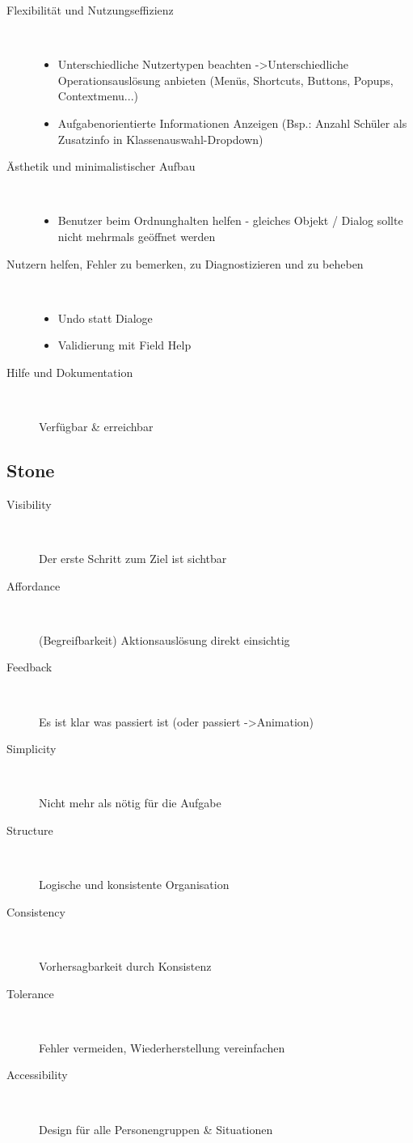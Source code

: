 \documentclass{report}
\begin{document}
\begin{description}
\item[Flexibilität und Nutzungseffizienz]~\par
\begin{itemize}
\item Unterschiedliche Nutzertypen beachten -\textgreater Unterschiedliche Operationsauslösung anbieten (Menüs, Shortcuts, Buttons, Popups, Contextmenu...)
\item Aufgabenorientierte Informationen Anzeigen (Bsp.: Anzahl Schüler als Zusatzinfo in Klassenauswahl-Dropdown)
\end{itemize}

\item[Ästhetik und minimalistischer Aufbau]~\par
\begin{itemize}
\item Benutzer beim Ordnunghalten helfen - gleiches Objekt / Dialog sollte nicht mehrmals geöffnet werden
\end{itemize}

\item[Nutzern helfen, Fehler zu bemerken, zu Diagnostizieren und zu beheben]~\par
\begin{itemize}
\item Undo statt Dialoge
\item Validierung mit Field Help
\end{itemize}
\item[Hilfe und Dokumentation]~\par
Verfügbar \& erreichbar
\end{description}

\newpage

\subsection*{Stone}

\begin{description}
\item[Visibility]~\par Der erste Schritt zum Ziel ist sichtbar
\item[Affordance]~\par (Begreifbarkeit) Aktionsauslösung direkt einsichtig
\item[Feedback]~\par Es ist klar was passiert ist (oder passiert -\textgreater Animation)
\item[Simplicity]~\par Nicht mehr als nötig für die Aufgabe
\item[Structure]~\par Logische und konsistente Organisation
\item[Consistency]~\par Vorhersagbarkeit durch Konsistenz
\item[Tolerance]~\par Fehler vermeiden, Wiederherstellung vereinfachen
\item[Accessibility]~\par Design für alle Personengruppen \& Situationen
\end{description}
\end{document}
